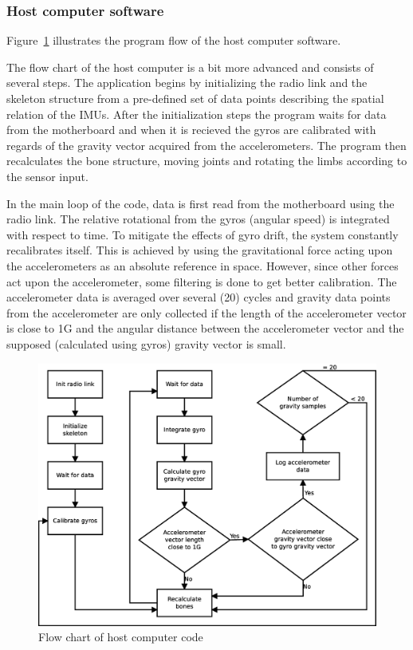 \documentclass[a4paper, 12pt]{article}
\begin{document}
\subsubsection*{Host computer software}
Figure~\ref{fig:pic4} illustrates the program flow of the host computer software.

The flow chart of the host computer is a bit more advanced and consists of several steps. The application begins by initializing the radio link and the skeleton structure from a pre-defined set of data points describing the spatial relation of the IMUs. After the initialization steps the program waits for data from the motherboard and when it is recieved the gyros are calibrated with regards of the gravity vector acquired from the accelerometers. The program then recalculates the bone structure, moving joints and rotating the limbs according to the sensor input.

In the main loop of the code, data is first read from the motherboard using the radio link. The relative rotational  from the gyros (angular speed) is integrated with respect to time. To mitigate the effects of gyro drift, the system constantly recalibrates itself. This is achieved by using the gravitational force acting upon the accelerometers as an absolute reference in space. However, since other forces act upon the accelerometer, some filtering is done to get better calibration. The accelerometer data is averaged over several (20) cycles and gravity data points from the accelerometer are only collected if the length of the accelerometer vector is close to 1G and the angular distance between the accelerometer vector and the supposed (calculated using gyros) gravity vector is small.

\begin{figure}[h!] %
    \centering
    \includegraphics[scale=0.38]{pi.eps}
    \caption{Flow chart of host computer code}
    \label{fig:pic4}
\end{figure}
\end{document}
